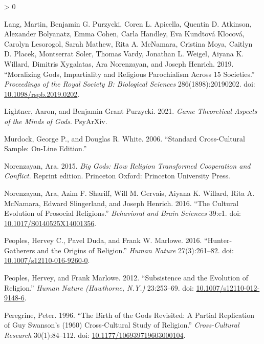\documentclass[
]{article}
\newlength{\cslhangindent}
\newenvironment{CSLReferences}[2] %
 {%
  \setlength{\parindent}{0pt}
  \ifodd #1 \everypar{\setlength{\hangindent}{\cslhangindent}}\ignorespaces\fi
  \ifnum #2 > 0
  \setlength{\parskip}{#2\baselineskip}
  \fi
 }%
 {}
\begin{document}
\begin{CSLReferences}{1}{0}
\leavevmode\hypertarget{ref-langMoralizingGodsImpartiality2019}{}%
Lang, Martin, Benjamin G. Purzycki, Coren L. Apicella, Quentin D. Atkinson, Alexander Bolyanatz, Emma Cohen, Carla Handley, Eva Kundtová Klocová, Carolyn Lesorogol, Sarah Mathew, Rita A. McNamara, Cristina Moya, Caitlyn D. Placek, Montserrat Soler, Thomas Vardy, Jonathan L. Weigel, Aiyana K. Willard, Dimitris Xygalatas, Ara Norenzayan, and Joseph Henrich. 2019. {``Moralizing Gods, Impartiality and Religious Parochialism Across 15 Societies.''} \emph{Proceedings of the Royal Society B: Biological Sciences} 286(1898):20190202. doi: \href{https://doi.org/10.1098/rspb.2019.0202}{10.1098/rspb.2019.0202}.

\leavevmode\hypertarget{ref-lightnerGameTheoreticalAspects2021}{}%
Lightner, Aaron, and Benjamin Grant Purzycki. 2021. \emph{Game {Theoretical} {Aspects} of the {Minds} of {Gods}}. PsyArXiv.

\leavevmode\hypertarget{ref-murdockStandardCrossCulturalSample2006}{}%
Murdock, George P., and Douglas R. White. 2006. {``Standard {Cross}-{Cultural} {Sample}: On-Line Edition.''}

\leavevmode\hypertarget{ref-norenzayanBigGodsHow2015}{}%
Norenzayan, Ara. 2015. \emph{Big {Gods}: {How} {Religion} {Transformed} {Cooperation} and {Conflict}}. Reprint edition. Princeton Oxford: Princeton University Press.

\leavevmode\hypertarget{ref-norenzayanCulturalEvolutionProsocial2016}{}%
Norenzayan, Ara, Azim F. Shariff, Will M. Gervais, Aiyana K. Willard, Rita A. McNamara, Edward Slingerland, and Joseph Henrich. 2016. {``The Cultural Evolution of Prosocial Religions.''} \emph{Behavioral and Brain Sciences} 39:e1. doi: \href{https://doi.org/10.1017/S0140525X14001356}{10.1017/S0140525X14001356}.

\leavevmode\hypertarget{ref-peoplesHunterGatherersOriginsReligion2016}{}%
Peoples, Hervey C., Pavel Duda, and Frank W. Marlowe. 2016. {``Hunter-{Gatherers} and the {Origins} of {Religion}.''} \emph{Human Nature} 27(3):261--82. doi: \href{https://doi.org/10.1007/s12110-016-9260-0}{10.1007/s12110-016-9260-0}.

\leavevmode\hypertarget{ref-peoplesSubsistenceEvolutionReligion2012}{}%
Peoples, Hervey, and Frank Marlowe. 2012. {``Subsistence and the {Evolution} of {Religion}.''} \emph{Human Nature (Hawthorne, N.Y.)} 23:253--69. doi: \href{https://doi.org/10.1007/s12110-012-9148-6}{10.1007/s12110-012-9148-6}.

\leavevmode\hypertarget{ref-peregrineBirthGodsRevisited1996}{}%
Peregrine, Peter. 1996. {``The {Birth} of the {Gods} {Revisited}: {A} {Partial} {Replication} of {Guy} {Swanson}'s (1960) {Cross}-{Cultural} {Study} of {Religion}.''} \emph{Cross-Cultural Research} 30(1):84--112. doi: \href{https://doi.org/10.1177/106939719603000104}{10.1177/106939719603000104}.


\end{CSLReferences}
\end{document}
